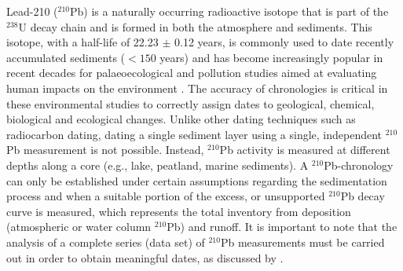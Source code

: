 \documentclass [10pt] {article}
\begin{document}
	Lead-210 ($^{210}$Pb) is a naturally occurring radioactive isotope that is part of the $^{238}$U decay chain and is formed in both the atmosphere and sediments. This isotope, with a half-life of 22.23 $\pm$ 0.12 years, is commonly used to date recently accumulated sediments ($<150$ years) and has become increasingly popular in recent decades for palaeoecological and pollution studies aimed at evaluating human impacts on the environment \citep[e.g.,][]{Courtney2019}. The accuracy of chronologies is critical in these environmental studies to correctly assign dates to geological, chemical, biological and ecological changes. Unlike other dating techniques such as radiocarbon dating, dating a single sediment layer using a single, independent $^{210}$Pb measurement is not possible. Instead, $^{210}$Pb activity is measured at different depths along a core (e.g., lake, peatland, marine sediments). A $^{210}$Pb-chronology can only be established under certain assumptions regarding the sedimentation process and when a suitable portion of the excess, or unsupported $^{210}$Pb decay curve is measured, which represents the total inventory from deposition (atmospheric or water column $^{210}$Pb) and runoff. It is important to note that the analysis of a complete series (data set) of $^{210}$Pb measurements must be carried out in order to obtain meaningful dates, as discussed by \citet{Aquino2018}.


\end{document}
